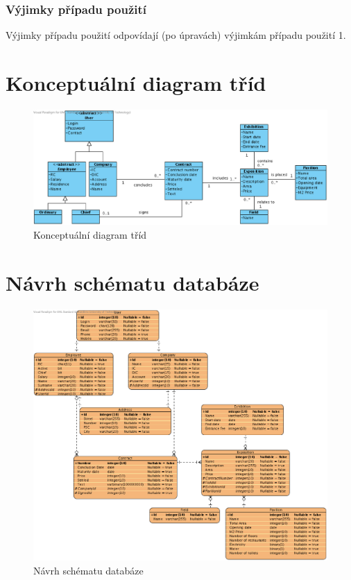 \subsubsection*{Výjimky případu použití }

Výjimky případu použití  odpovídají (po úpravách)
výjimkám případu použití 1.


\pagebreak

\section*{Konceptuální diagram tříd}

\begin{figure}[H]
	\begin{center}
		\includegraphics[width=16cm,keepaspectratio]{include/conceptual_final}
	\end{center}
	\caption{Konceptuální diagram tříd}
	\label{fig:ConceptualFinal}
\end{figure}

\pagebreak

\section*{Návrh schématu databáze}

\begin{figure}[H]
	\begin{center}
		\includegraphics[width=16cm,keepaspectratio]{include/schema_final}
	\end{center}
	\caption{Návrh schématu databáze}
	\label{fig:SchemaFinal}
\end{figure}

